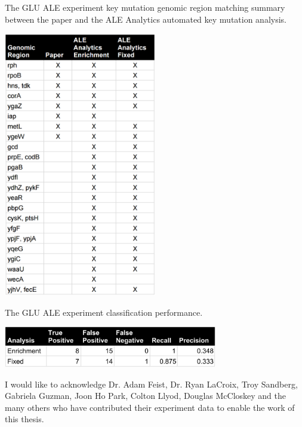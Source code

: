 \documentclass[12pt,final,masters,chapterheads]{ucsd}  %
\begin{document}
\begin{table}[H]
  \centering
  \caption{The GLU ALE experiment {key mutation} genomic region matching summary between the paper and the ALE Analytics automated key mutation analysis.}
  \includegraphics[width=0.5\textwidth]{glu_key_mutation_regions.png}
\end{table}
\begin{table}[H]
  \centering
  \caption{The GLU ALE experiment classification performance.}
  \includegraphics[width=0.7\textwidth]{glu_precision_recall.png}
\end{table}

\clearpage
I would like to acknowledge Dr. Adam Feist, Dr. Ryan LaCroix, Troy Sandberg, Gabriela Guzman, Joon Ho Park, Colton Llyod, Douglas McCloskey and the many others who have contributed their experiment data to enable the work of this thesis.
\end{document}
